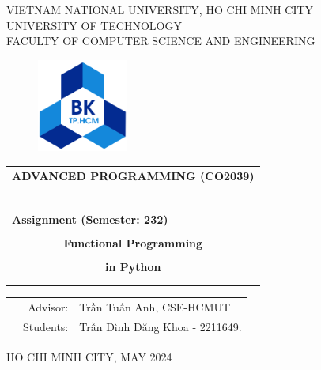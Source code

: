 \documentclass[a4paper]{article}
\begin{document}
\begin{titlepage}
\begin{center}
VIETNAM NATIONAL UNIVERSITY, HO CHI MINH CITY \\
UNIVERSITY OF TECHNOLOGY \\
FACULTY OF COMPUTER SCIENCE AND ENGINEERING
\end{center}

\vspace{1cm}

\begin{figure}[h!]
\begin{center}
\includegraphics[width=3cm]{hcmut.png}
\end{center}
\end{figure}

\vspace{1cm}


\begin{center}
\begin{tabular}{c}
\multicolumn{1}{l}{\textbf{{\Large ADVANCED PROGRAMMING (CO2039)}}}\\
~~\\
\hline
\\
\multicolumn{1}{l}{\textbf{{Assignment (Semester: 232)}}}\\
\\
\textbf{{\Huge Functional Programming}}\\
\\
\textbf{{\Huge in Python}}\\[10pt]

\multicolumn{1}{l}{}\\
\\
\hline
\end{tabular}
\end{center}
\vspace{2cm}

\begin{table}[h]
	\begin{tabular}{rrl}
		\hspace{5 cm} & Advisor: & Trần Tuấn Anh, CSE-HCMUT\\[6pt]
		& Students: & Trần Đình Đăng Khoa \hspace*{0.05cm} - 2211649. \\
	\end{tabular}
\end{table}

\vspace*{1cm}

\begin{center}
{\footnotesize HO CHI MINH CITY, MAY 2024}
\end{center}
\end{titlepage}
\end{document}

